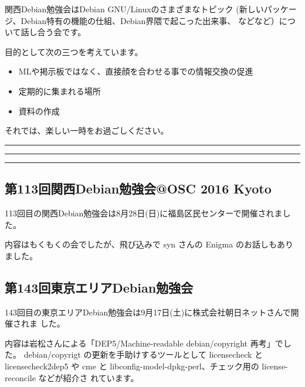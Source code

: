 \documentclass[mingoth,a4paper]{jsarticle}
\begin{document}
\vspace{1em}

関西Debian勉強会はDebian GNU/Linuxのさまざまなトピック
(新しいパッケージ、Debian特有の機能の仕組、Debian界隈で起こった出来事、
などなど）について話し合う会です。

目的として次の三つを考えています。
\begin{itemize}
\item MLや掲示板ではなく、直接顔を合わせる事での情報交換の促進
\item 定期的に集まれる場所
\item 資料の作成
\end{itemize}

 それでは、楽しい一時をお過ごしください。

\newpage

\begin{minipage}[b]{0.2\hsize}
  {}
\end{minipage}
\begin{minipage}[b]{0.8\hsize}
\hrule
\vspace{2mm}
\hrule
\setcounter{tocdepth}{1}
\tableofcontents
\vspace{2mm}
\hrule
\end{minipage}


\subsection{第113回関西Debian勉強会@OSC 2016 Kyoto}

113回目の関西Debian勉強会は8月28日(日)に福島区民センターで開催されました。

内容はもくもくの会でしたが、飛び込みで syn さんの Enigma のお話しもありました。


\subsection{第143回東京エリアDebian勉強会}

143回目の東京エリアDebian勉強会は9月17日(土)に株式会社朝日ネットさんで開催されま
した。

内容は岩松さんによる「DEP5/Machine-readable debian/copyright 再考」でした。
debian/copyrigt の更新を手助けするツールとして licensecheck と licensecheck2dep5
や cme と libconfig-model-dpkg-perl、チェック用の license-reconcile などが紹介さ
れています。
\end{document}
